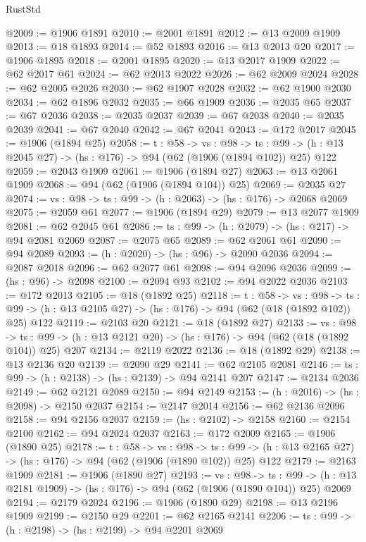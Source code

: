 \begin{lexlean}{RustStd}
\begin{coremodule}
{\begin{coremodule}
{{{{{{{{{@2009 := @1906 @1891
@2010 := @2001 @1891
@2012 := @13 @2009 @1909
@2013 := @18 @1893
@2014 := @52 @1893
@2016 := @13 @2013 @20
@2017 := @1906 @1895
@2018 := @2001 @1895
@2020 := @13 @2017 @1909
@2022 := @62 @2017 @61
@2024 := @62 @2013 @2022
@2026 := @62 @2009 @2024
@2028 := @62 @2005 @2026
@2030 := @62 @1907 @2028
@2032 := @62 @1900 @2030
@2034 := @62 @1896 @2032
@2035 := @66 @1909
@2036 := @2035 @65
@2037 := @67 @2036
@2038 := @2035 @2037
@2039 := @67 @2038
@2040 := @2035 @2039
@2041 := @67 @2040
@2042 := @67 @2041
@2043 := @172 @2017
@2045 := @1906 (@1894 @25)
@2058 := {t : @58} ->
  {vs : @98} ->
  {ts : @99} -> (h : @13 @2045 @27) -> (hs : @176) -> @94 (@62 (@1906 (@1894 @102)) @25) @122
@2059 := @2043 @1909
@2061 := @1906 (@1894 @27)
@2063 := @13 @2061 @1909
@2068 := @94 (@62 (@1906 (@1894 @104)) @25)
@2069 := @2035 @27
@2074 := {vs : @98} -> {ts : @99} -> (h : @2063) -> (hs : @176) -> @2068 @2069
@2075 := @2059 @61
@2077 := @1906 (@1894 @29)
@2079 := @13 @2077 @1909
@2081 := @62 @2045 @61
@2086 := {ts : @99} -> (h : @2079) -> (hs : @217) -> @94 @2081 @2069
@2087 := @2075 @65
@2089 := @62 @2061 @61
@2090 := @94 @2089
@2093 := (h : @2020) -> (hs : @96) -> @2090 @2036
@2094 := @2087 @2018
@2096 := @62 @2077 @61
@2098 := @94 @2096 @2036
@2099 := (hs : @96) -> @2098
@2100 := @2094 @93
@2102 := @94 @2022 @2036
@2103 := @172 @2013
@2105 := @18 (@1892 @25)
@2118 := {t : @58} ->
  {vs : @98} ->
  {ts : @99} -> (h : @13 @2105 @27) -> (hs : @176) -> @94 (@62 (@18 (@1892 @102)) @25) @122
@2119 := @2103 @20
@2121 := @18 (@1892 @27)
@2133 := {vs : @98} ->
  {ts : @99} -> (h : @13 @2121 @20) -> (hs : @176) -> @94 (@62 (@18 (@1892 @104)) @25) @207
@2134 := @2119 @2022
@2136 := @18 (@1892 @29)
@2138 := @13 @2136 @20
@2139 := @2090 @29
@2141 := @62 @2105 @2081
@2146 := {ts : @99} -> (h : @2138) -> (hs : @2139) -> @94 @2141 @207
@2147 := @2134 @2036
@2149 := @62 @2121 @2089
@2150 := @94 @2149
@2153 := (h : @2016) -> (hs : @2098) -> @2150 @2037
@2154 := @2147 @2014
@2156 := @62 @2136 @2096
@2158 := @94 @2156 @2037
@2159 := (hs : @2102) -> @2158
@2160 := @2154 @2100
@2162 := @94 @2024 @2037
@2163 := @172 @2009
@2165 := @1906 (@1890 @25)
@2178 := {t : @58} ->
  {vs : @98} ->
  {ts : @99} -> (h : @13 @2165 @27) -> (hs : @176) -> @94 (@62 (@1906 (@1890 @102)) @25) @122
@2179 := @2163 @1909
@2181 := @1906 (@1890 @27)
@2193 := {vs : @98} ->
  {ts : @99} -> (h : @13 @2181 @1909) -> (hs : @176) -> @94 (@62 (@1906 (@1890 @104)) @25) @2069
@2194 := @2179 @2024
@2196 := @1906 (@1890 @29)
@2198 := @13 @2196 @1909
@2199 := @2150 @29
@2201 := @62 @2165 @2141
@2206 := {ts : @99} -> (h : @2198) -> (hs : @2199) -> @94 @2201 @2069
}}}}}}}}}
\end{coremodule}}
\end{coremodule}
\end{lexlean}
